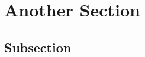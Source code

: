 
\section{Another Section}

\blindtext

\blindtext

\subsection{Subsection}

\blindtext

\blindtext 

\blindtext 

\blindtext 

\blindtext

\blindtext
